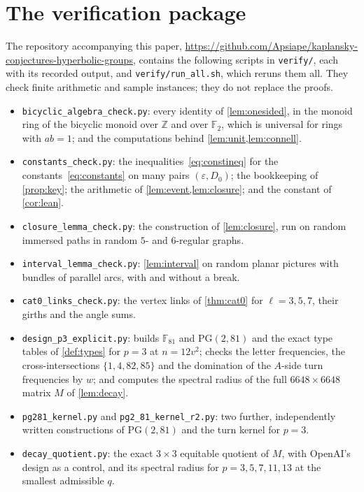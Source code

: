 \documentclass[11pt]{article}
\theoremstyle{definition}
\theoremstyle{plain}
\newcommand{\F}{\mathbb{F}}
\newcommand{\Z}{\mathbb{Z}}
\newcommand{\PG}{\mathrm{PG}}
\newcommand{\eps}{\varepsilon}
\begin{document}
\section{The verification package}\label{app:checks}

The repository accompanying this paper, \url{https://github.com/Apsiape/kaplansky-conjectures-hyperbolic-groups}, contains the following scripts in \texttt{verify/}, each with its recorded output, and \texttt{verify/run\_all.sh}, which reruns them all. They check finite arithmetic and sample instances; they do not replace the proofs.
\begin{itemize}[itemsep=1pt]
\item \texttt{bicyclic\_algebra\_check.py}: every identity of \cref{lem:onesided}, in the monoid ring of the bicyclic monoid over $\Z$ and over $\F_2$, which is universal for rings with $ab=1$; and the computations behind \cref{lem:unit,lem:connell}.
\item \texttt{constants\_check.py}: the inequalities~\eqref{eq:constineq} for the constants~\eqref{eq:constants} on many pairs $(\eps,D_0)$; the bookkeeping of \cref{prop:key}; the arithmetic of \cref{lem:event,lem:closure}; and the constant of \cref{cor:lean}.
\item \texttt{closure\_lemma\_check.py}: the construction of \cref{lem:closure}, run on random immersed paths in random $5$- and $6$-regular graphs.
\item \texttt{interval\_lemma\_check.py}: \cref{lem:interval} on random planar pictures with bundles of parallel arcs, with and without a break.
\item \texttt{cat0\_links\_check.py}: the vertex links of \cref{thm:cat0} for $\ell=3,5,7$, their girths and the angle sums.
\item \texttt{design\_p3\_explicit.py}: builds $\F_{81}$ and $\PG(2,81)$ and the exact type tables of \cref{def:types} for $p=3$ at $n=12v^2$; checks the letter frequencies, the cross-intersections $\{1,4,82,85\}$ and the domination of the $A$-side turn frequencies by $w$; and computes the spectral radius of the full $6648\times6648$ matrix $M$ of \cref{lem:decay}.
\item \texttt{pg281\_kernel.py} and \texttt{pg2\_81\_kernel\_r2.py}: two further, independently written constructions of $\PG(2,81)$ and the turn kernel for $p=3$.
\item \texttt{decay\_quotient.py}: the exact $3\times3$ equitable quotient of $M$, with OpenAI's design as a control, and its spectral radius for $p=3,5,7,11,13$ at the smallest admissible $q$.

\end{itemize}
\end{document}
